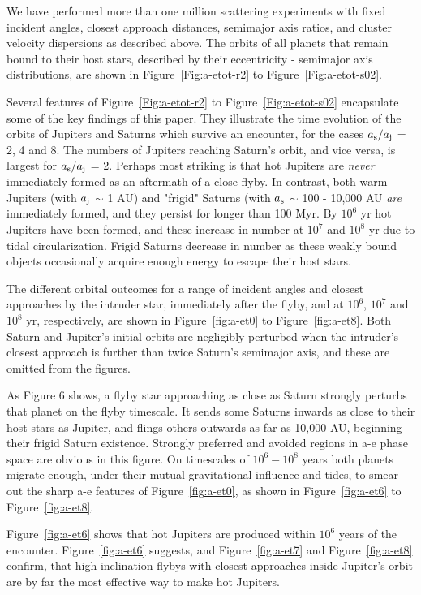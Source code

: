 \documentclass[twocolumn]{aastex63}
\newcommand*\fgr[1]{Figure~\ref{#1}}
\begin{document}
 We have performed more than one million scattering experiments with fixed incident angles, closest approach distances, semimajor axis ratios, and cluster velocity dispersions as described above. The orbits of all planets that remain bound to their host stars, described by their eccentricity - semimajor axis distributions, are shown in \fgr{Fig:a-etot-r2} to \fgr{Fig:a-etot-s02}.  
 
 Several features of \fgr{Fig:a-etot-r2} to \fgr{Fig:a-etot-s02} encapsulate some of the key findings of this paper. They illustrate the time evolution of the orbits of Jupiters and Saturns which survive an encounter, for the cases $a_{\rm s}/a_{\rm j}$ = 2, 4 and 8. The numbers of Jupiters reaching Saturn's orbit, and vice versa, is largest for $a_{\rm s}/a_{\rm j}$ = 2. Perhaps most striking is that hot Jupiters are {\it never} immediately formed as an aftermath of a close flyby. In contrast, both warm Jupiters (with $a_{\rm j}$ $\sim$ 1 AU) and "frigid" Saturns (with $a_{\rm s}$ $\sim$ 100 - 10,000 AU {\it are} immediately formed, and they persist for longer than 100 Myr. By $10^{6}$ yr hot Jupiters have been formed, and these increase in number at $10^{7}$ and $10^{8}$ yr due to tidal circularization. Frigid Saturns decrease in number as these weakly bound objects occasionally acquire enough energy to escape their host stars. 
 
 The different orbital outcomes for a range of incident angles and closest approaches by the intruder star, immediately after the flyby, and at $10^{6}$, $10^{7}$ and $10^{8}$ yr, respectively, are shown in \fgr{fig:a-et0} to \fgr{fig:a-et8}. Both Saturn and Jupiter's initial orbits are negligibly perturbed when the intruder's closest approach is further than twice Saturn's semimajor axis, and these are omitted from the figures. 
 
 As Figure 6 shows, a flyby star approaching as close as Saturn strongly perturbs that planet on the flyby timescale. It sends some Saturns inwards as close to their host stars as Jupiter, and flings others outwards as far as 10,000 AU, beginning their frigid Saturn existence. Strongly preferred and avoided regions in a-e phase space are obvious in this figure. On timescales of $10^{6} - 10^{8}$ years both planets migrate enough, under their mutual gravitational influence and tides, to smear out the sharp a-e features of \fgr{fig:a-et0}, as shown in \fgr{fig:a-et6} to \fgr{fig:a-et8}. 
 
 \fgr{fig:a-et6} shows that hot Jupiters are produced within $10^{6}$ years of the encounter. \fgr{fig:a-et6} suggests, and \fgr{fig:a-et7} and \fgr{fig:a-et8} confirm, that high inclination flybys with closest approaches inside Jupiter's orbit are by far the most effective way to make hot Jupiters. 
 
\end{document}
